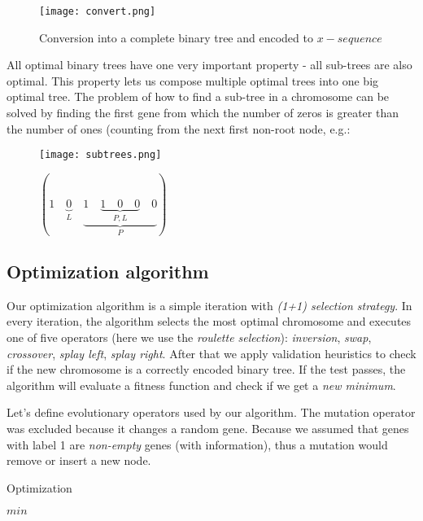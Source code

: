 \documentclass[12pt]{article}
\newlength\singleindent
\newcommand\bindent{%
  \begingroup
  \setlength{\itemindent}{\singleindent}
  \addtolength{\algorithmicindent}{\singleindent}
}
\newcommand\eindent{\endgroup}
\begin{document}
\begin{figure}[ht]
\centering
\texttt{[image: convert.png]}
\caption{Conversion into a complete binary tree and encoded to $x-sequence$}
\label{fig:convert}
\end{figure}

All optimal binary trees have one very important property - all sub-trees are also optimal. This property lets us compose multiple optimal trees into one big optimal tree.
The problem of how to find a sub-tree in a chromosome can be solved by finding the first gene from which the number of zeros is greater  than the number of ones (counting from the next first non-root node, e.g.:

\clearpage
\begin{figure}[ht]
\centering
\texttt{[image: subtrees.png]}

$(1\quad\underbrace{0}_{L}\quad\underbrace{1\quad\underbrace{1\quad 0\quad 0}_{P,L}\quad 0}_{P})$
\label{fig:subtrees}
\end{figure}

\subsection{Optimization algorithm}

Our optimization algorithm is a simple iteration with \textit{(1+1) selection strategy}. In every iteration, the algorithm selects the most optimal chromosome and executes one of five operators (here we use the \textit{roulette selection}): \textit{inversion}, \textit{swap}, \textit{crossover}, \textit{splay left}, \textit{splay right}. After that we apply validation heuristics to check if the new chromosome is a correctly encoded binary tree. If the test passes, the algorithm will evaluate a fitness function and check if we get a \textit{new minimum}.

Let's define evolutionary operators used by our algorithm. The mutation operator was excluded because it changes a random gene. Because we assumed that genes with label 1 are \textit{non-empty} genes (with information), thus a mutation would remove or insert a new node.

\clearpage

\begin{algorithm}
\scriptsize
\caption{Optimization}
\begin{algorithmic}[]
    \bindent
            \ENDIF
            \ELSE
            \ENDIF
        \ENDFOR
        \RETURN $min$
    \eindent
\end{algorithmic}
\end{algorithm}
\end{document}
